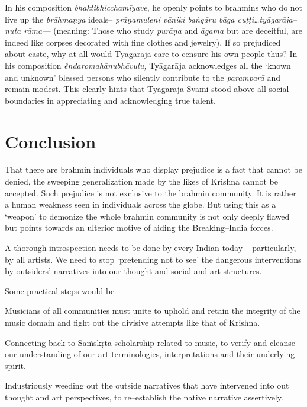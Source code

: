 In his composition \textit{bhakti}\textit{bhicchamīyave}, he openly points to brahmins who do not live up the \textit{brāhmaṇya} ideals– \textit{prāṇamuleni vāniki baṅgāru bāga cuṭṭi…tyāgarāja–nuta rāma—} (meaning: Those who study \textit{purāṇa} and \textit{āgama} but are deceitful, are indeed like corpses decorated with fine clothes and jewelry). If so prejudiced about caste, why at all would Tyāgarāja care to censure his own people thus? In his composition \textit{êndaro}\textit{mahānubhāvulu,} Tyāgarāja acknowledges all the ‘known and unknown’ blessed persons who silently contribute to the \textit{paramparā} and remain modest. This clearly hints that Tyāgarāja Svāmi stood above all social boundaries in appreciating and acknowledging true talent.


\section*{Conclusion}

That there are brahmin individuals who display prejudice is a fact that cannot be denied, the sweeping generalization made by the likes of Krishna cannot be accepted. Such prejudice is not exclusive to the brahmin community. It is rather a human weakness seen in individuals across the globe. But using this as a ‘weapon’ to demonize the whole brahmin community is not only deeply flawed but points towards an ulterior motive of aiding the Breaking–India forces.

A thorough introspection needs to be done by every Indian today – particularly, by all artists. We need to stop ‘pretending not to see’ the dangerous interventions by outsiders’ narratives into our thought and social and art structures.

Some practical steps would be –

\item Musicians of all communities must unite to uphold and retain the integrity of the music domain and fight out the divisive attempts like that of Krishna.

 \item Connecting back to Saṁskṛta scholarship related to music, to verify and cleanse our understanding of our art terminologies, interpretations and their underlying spirit.

 \item Industriously weeding out the outside narratives that have intervened into out thought and art perspectives, to re–establish the native narrative assertively.

